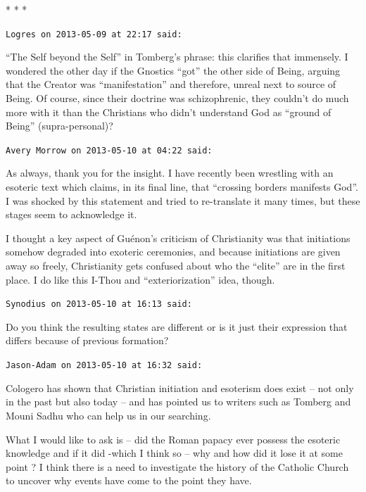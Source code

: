 
\begin{center}* * *\end{center}

\begin{footnotesize}
\begin{sffamily}
\texttt{Logres on 2013-05-09 at 22:17 said:}

``The Self beyond the Self'' in Tomberg's phrase: this clarifies that immensely. I wondered the other day if the Gnostics ``got'' the other side of Being, arguing that the Creator was ``manifestation'' and therefore, unreal next to source of Being. Of course, since their doctrine was schizophrenic, they couldn't do much more with it than the Christians who didn't understand God as ``ground of Being'' (supra-personal)?

\hfill

\texttt{Avery Morrow on 2013-05-10 at 04:22 said:}

As always, thank you for the insight. I have recently been wrestling with an esoteric text which claims, in its final line, that ``crossing borders manifests God''. I was shocked by this statement and tried to re-translate it many times, but these stages seem to acknowledge it.

I thought a key aspect of Guénon's criticism of Christianity was that initiations somehow degraded into exoteric ceremonies, and because initiations are given away so freely, Christianity gets confused about who the ``elite'' are in the first place. I do like this I-Thou and ``exteriorization'' idea, though.

\hfill

\texttt{Synodius on 2013-05-10 at 16:13 said:}

Do you think the resulting states are different or is it just their expression that differs because of previous formation?

\hfill

\texttt{Jason-Adam on 2013-05-10 at 16:32 said:}

Cologero has shown that Christian initiation and esoterism does exist -- not only in the past but also today -- and has pointed us to writers such as Tomberg and Mouni Sadhu who can help us in our searching.

What I would like to ask is -- did the Roman papacy ever possess the esoteric knowledge and if it did -which I think so -- why and how did it lose it at some point ? I think there is a need to investigate the history of the Catholic Church to uncover why events have come to the point they have.


\end{sffamily}
\end{footnotesize}
